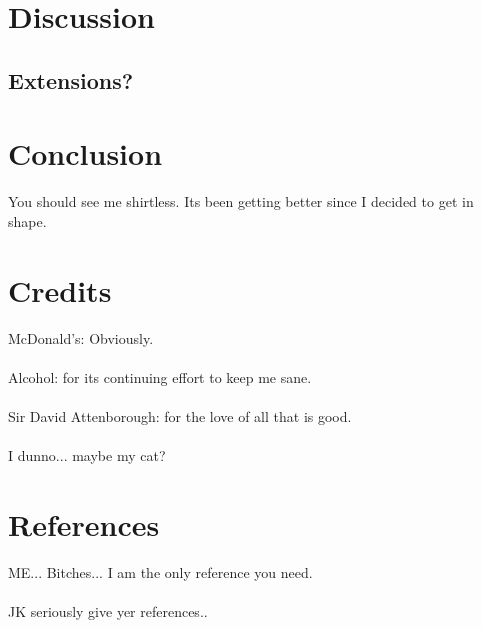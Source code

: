 \documentclass[11pt, oneside]{article}
\begin{document}
\pagebreak
\section*{Discussion}




\subsection*{Extensions?}



\pagebreak
\section{Conclusion}
You should see me shirtless. Its been getting better since I decided to get in shape.


\section{Credits}
McDonald's: Obviously.\\
\\
Alcohol: for its continuing effort to keep me sane.\\
\\
Sir David Attenborough: for the love of all that is good.\\
\\
I dunno... maybe my cat?


\section*{References}
ME... Bitches... I am the only reference you need.\\
\\
JK seriously give yer references..
\end{document}
